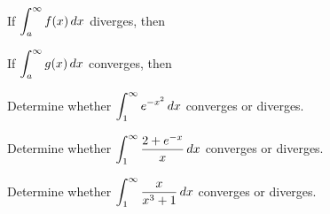 \documentclass[12pt]{article}
\begin{document}
\vspace{5mm}

If $\displaystyle\int_a^\infty f(x)\,dx$ diverges, then

\vspace{25mm}

If $\displaystyle\int_a^\infty g(x)\,dx$ converges, then

\vspace{25mm}

\Example Determine whether $\displaystyle\int_1^\infty e^{-x^2}\,dx$ converges or diverges.

\newpage



\Example Determine whether $\displaystyle\int_1^\infty\frac{2+e^{-x}}{x}\,dx$ converges or diverges.

\vfill

\Example Determine whether $\displaystyle\int_1^\infty\frac{x}{x^3+1}\,dx$ converges or diverges.

\vfill
\end{document}
